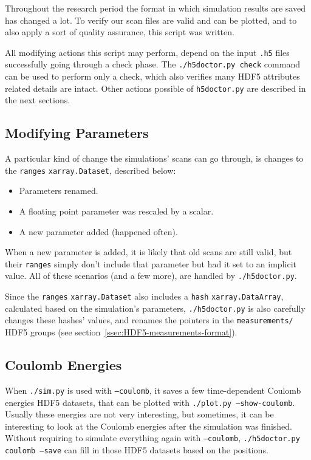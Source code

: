 Throughout the research period the format in which simulation results are saved has changed a lot. To verify our scan files are valid and can be plotted, and to also apply a sort of quality assurance, this script was written.

All modifying actions this script may perform, depend on the input \texttt{.h5} files successfully going through a check phase. The \texttt{./h5doctor.py check} command can be used to perform only a check, which also verifies many HDF5 attributes related details are intact. Other actions possible of \texttt{h5doctor.py} are described in the next sections. 

\subsection{Modifying Parameters}

A particular kind of change the simulations' scans can go through, is changes to the \texttt{ranges} \texttt{xarray.Dataset}, described below:

\begin{itemize}
	\item Parameters renamed.
	\item A floating point parameter was rescaled by a scalar.
	\item A new parameter added (happened often).
\end{itemize}

When a new parameter is added, it is likely that old scans are still valid, but their \texttt{ranges} simply don't include that parameter but had it set to an implicit value. All of these scenarios (and a few more), are handled by \texttt{./h5doctor.py}.

Since the \texttt{ranges} \texttt{xarray.Dataset} also includes a \texttt{hash} \texttt{xarray.DataArray}, calculated based on the simulation's parameters,  \texttt{./h5doctor.py} is also carefully changes these hashes' values, and renames the pointers in the \texttt{measurements/} HDF5 groups (see section~\ref{ssec:HDF5-measurements-format}).

\subsection{Coulomb Energies}

When \texttt{./sim.py} is used with \texttt{--coulomb}, it saves a few time-dependent Coulomb energies HDF5 datasets, that can be plotted with \texttt{./plot.py --show-coulomb}. Usually these energies are not very interesting, but sometimes, it can be interesting to look at the Coulomb energies after the simulation was finished. Without requiring to simulate everything again with \texttt{--coulomb}, \texttt{./h5doctor.py coulomb --save} can fill in those HDF5 datasets based on the positions.


